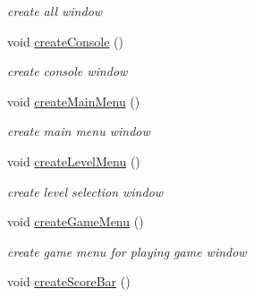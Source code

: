 \begin{DoxyCompactItemize}
\begin{DoxyCompactList}\small\item\em create all window \end{DoxyCompactList}\item 
void \hyperlink{class_n_c_t_u_1_1_g_u_i_manager_aac5969837735163f0675a9573bce1517}{create\+Console} ()\hypertarget{class_n_c_t_u_1_1_g_u_i_manager_aac5969837735163f0675a9573bce1517}{}\label{class_n_c_t_u_1_1_g_u_i_manager_aac5969837735163f0675a9573bce1517}

\begin{DoxyCompactList}\small\item\em create console window \end{DoxyCompactList}\item 
void \hyperlink{class_n_c_t_u_1_1_g_u_i_manager_a4fc262aae03e436fa639cef515ec153e}{create\+Main\+Menu} ()\hypertarget{class_n_c_t_u_1_1_g_u_i_manager_a4fc262aae03e436fa639cef515ec153e}{}\label{class_n_c_t_u_1_1_g_u_i_manager_a4fc262aae03e436fa639cef515ec153e}

\begin{DoxyCompactList}\small\item\em create main menu window \end{DoxyCompactList}\item 
void \hyperlink{class_n_c_t_u_1_1_g_u_i_manager_a725e1c465b077557a2e3719704e4d42f}{create\+Level\+Menu} ()\hypertarget{class_n_c_t_u_1_1_g_u_i_manager_a725e1c465b077557a2e3719704e4d42f}{}\label{class_n_c_t_u_1_1_g_u_i_manager_a725e1c465b077557a2e3719704e4d42f}

\begin{DoxyCompactList}\small\item\em create level selection window \end{DoxyCompactList}\item 
void \hyperlink{class_n_c_t_u_1_1_g_u_i_manager_ae04e3c736991587a84b8ad635e77f8e9}{create\+Game\+Menu} ()\hypertarget{class_n_c_t_u_1_1_g_u_i_manager_ae04e3c736991587a84b8ad635e77f8e9}{}\label{class_n_c_t_u_1_1_g_u_i_manager_ae04e3c736991587a84b8ad635e77f8e9}

\begin{DoxyCompactList}\small\item\em create game menu for playing game window \end{DoxyCompactList}\item 
void \hyperlink{class_n_c_t_u_1_1_g_u_i_manager_a6550cb1085c935d9128461b73761319e}{create\+Score\+Bar} ()\hypertarget{class_n_c_t_u_1_1_g_u_i_manager_a6550cb1085c935d9128461b73761319e}{}\label{class_n_c_t_u_1_1_g_u_i_manager_a6550cb1085c935d9128461b73761319e}


\end{DoxyCompactItemize}

